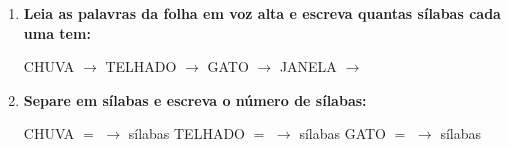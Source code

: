\begin{exercicio}
\begin{enumerate}[resume]
  \item \textbf{Leia as palavras da folha em voz alta e escreva quantas sílabas cada uma tem:}

  \begin{center}
  CHUVA $\rightarrow$ \underline{\hspace{1cm}} \quad TELHADO $\rightarrow$ \underline{\hspace{1cm}} \quad GATO $\rightarrow$ \underline{\hspace{1cm}} \quad JANELA $\rightarrow$ \underline{\hspace{1cm}}
  \end{center}

  \item \textbf{Separe em sílabas e escreva o número de sílabas:}
  \begin{center}
  CHUVA $=$ \underline{\hspace{1.2cm}} $\rightarrow$ \underline{\hspace{0.8cm}} sílabas \quad TELHADO $=$ \underline{\hspace{1.2cm}} $\rightarrow$ \underline{\hspace{0.8cm}} sílabas \quad GATO $=$ \underline{\hspace{1.2cm}} $\rightarrow$ \underline{\hspace{0.8cm}} sílabas
  \end{center}

\end{enumerate}

\end{exercicio}



